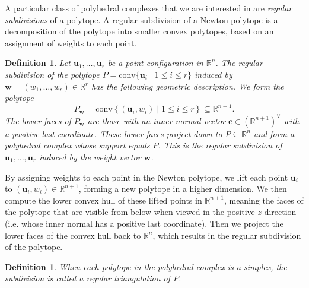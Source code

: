 \documentclass[11pt,reqno,a4paper]{article}
\theoremstyle{theoremstyle}
\theoremstyle{examplestyle}
\newtheorem{definition}[theorem]{Definition}
\theoremstyle{algorithmstyle}
\numberwithin{equation}{subsection}
\newcommand{\RR}{\mathbb{R}}
\begin{document}
A particular class of polyhedral complexes that we are interested in are \textit{regular subdivisions} of a polytope. A regular subdivision of a Newton polytope is a decomposition of the polytope into smaller convex polytopes, based on an assignment of weights to each point.

\begin{definition}
    Let $\mathbf{u}_1,\ldots,\mathbf{u}_r$ be a point configuration in $\RR^n$. The \textit{regular subdivision} of the polytope $P = \text{conv}\{\mathbf{u}_i \; |\; 1 \leq i \leq r\}$ induced by $\mathbf{w} = (w_1,\ldots,w_r) \in \RR^r$ has the following geometric description. We form the polytope 
    \[P_\mathbf{w} = \text{conv}\left\{ (\mathbf{u}_i,w_i) \; | \; 1 \leq i \leq r \right\} \subseteq \RR^{n+1}.\] The lower faces of $P_\mathbf{w}$ are those with an inner normal vector $\mathbf{c} \in (\RR^{n+1})^\vee$ with a positive last coordinate. These lower faces project down to $P \subseteq \RR^n$ and form a polyhedral complex whose support equals $P$. This is the \textit{regular subdivision} of $\mathbf{u}_1,\ldots,\mathbf{u}_r$ induced by the weight vector $\mathbf{w}$.
\end{definition}

By assigning weights to each point in the Newton polytope, we lift each point \(\mathbf{u}_i\) to \((\mathbf{u}_i, w_i) \in \mathbb{R}^{n+1}\), forming a new polytope in a higher dimension. We then compute the lower convex hull of these lifted points in $\RR^{n+1}$, meaning the faces of the polytope that are visible from below when viewed in the positive \(z\)-direction (i.e. whose inner normal has a positive last coordinate). Then we project the lower faces of the convex hull back to $\RR^n$, which results in the regular subdivision of the polytope.

\begin{definition}
    When each polytope in the polyhedral complex is a simplex, the subdivision is called a \textit{regular triangulation} of $P$.
\end{definition}
\end{document}
